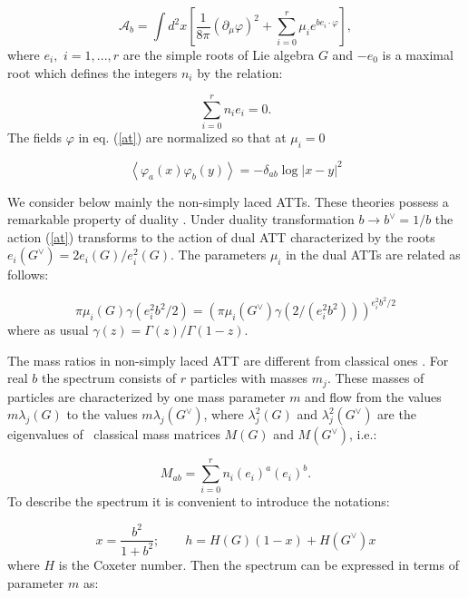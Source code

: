 \documentclass[a4paper,12pt,titlepage,final]{article}
\begin{document}
\begin{equation}
\mathcal{A}_{b}=\int d^{2}x\left[ \frac{1}{8\pi }(\partial _{\mu }\varphi
)^{2}+\sum_{i=0}^{r}\mu _{i}e^{be_{i}\cdot \varphi }\right] ,  \label{at}
\end{equation}
where $e_{i},$ $i=1,...,r$ are the simple roots of Lie algebra $G$
and $-e_{0}$ is a maximal root which defines the integers $n_{i}$
by the relation:

\begin{equation}
\sum_{i=0}^{r}n_{i}e_{i}=0.  \label{mr}
\end{equation}
The fields $\varphi $ in eq. (\ref{at}) are normalized so that at $\mu
_{i}=0 $

\begin{equation}
\left\langle \varphi _{a}(x) \varphi _{b}(y)\right\rangle =-\delta _{ab}\log
\left| x-y\right| ^{2}  \label{n}
\end{equation}

We consider below mainly the non-simply laced ATTs. These theories possess
a remarkable property of duality \cite{DGZ}.
Under duality transformation $b\rightarrow b^{\vee }=1/b$
the action (\ref{at}) transforms to the action
of dual ATT characterized by the roots $e_{i}(G^{\vee
})=2e_{i}(G)/e_{i}^{2}(G)$. The parameters $\mu _{i}$ in the dual ATTs are
related as follows:

\begin{equation}
\pi \mu _{i}(G)\gamma (e_{i}^{2}b^{2}/2)=\left( \pi \mu _{i}(G^{\vee
})\gamma (2/(e_{i}^{2}b^{2}))\right) ^{e_{i}^{2}b^{2}/2}  \label{mumu}
\end{equation}
where as usual $\gamma (z)=\Gamma (z)/\Gamma (1-z)$.

The mass ratios in non-simply laced ATT are different from classical ones
\cite{DGZ}. For real $b$ the spectrum consists of $r$ particles with masses
$m_{j}$. These masses of particles
are characterized by one mass parameter $m$
and flow from the values $m\lambda _{j}(G)$ to the values $m\lambda
_{j}(G^{\vee })$, where $\lambda _{j}^{2}(G)$ and $\lambda _{j}^{2}(G^{\vee
})$ are the eigenvalues of \ classical mass matrices $M(G)$ and $M(G^{\vee
}) $, i.e.:

\begin{equation}
M_{ab}=\sum_{i=0}^{r}n_{i}(e_{i})^{a}(e_{i})^{b}.  \label{mab}
\end{equation}
To describe the spectrum it is convenient to introduce the notations:

\begin{equation}
x=\frac{b^{2}}{1+b^{2}};\qquad h=H(G)(1-x)+H(G^{\vee })x  \label{ah}
\end{equation}
where $H$ is the Coxeter number. Then the spectrum can be expressed in terms
of parameter $m$ as:
\end{document}
